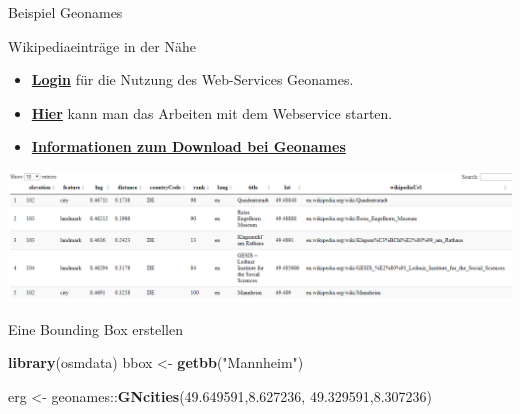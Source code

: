 \documentclass[ignorenonframetext,]{beamer}
\newenvironment{Shaded}{\begin{snugshade}}{\end{snugshade}}
\newcommand{\FloatTok}[1]{\textcolor[rgb]{0.27,0.67,0.26}{#1}}
\newcommand{\KeywordTok}[1]{\textcolor[rgb]{0.26,0.66,0.93}{\textbf{#1}}}
\newcommand{\NormalTok}[1]{\textcolor[rgb]{0.74,0.68,0.62}{#1}}
\newcommand{\OperatorTok}[1]{\textcolor[rgb]{0.74,0.68,0.62}{#1}}
\newcommand{\StringTok}[1]{\textcolor[rgb]{0.02,0.61,0.04}{#1}}
\begin{document}
\begin{frame}{Beispiel Geonames}
\protect\hypertarget{beispiel-geonames}{}

\begin{block}{Wikipediaeinträge in der Nähe}

\begin{itemize}
\item
  \href{http://www.geonames.org/login}{\textbf{Login}} für die Nutzung
  des Web-Services Geonames.
\item
  \href{http://www.geonames.org/enablefreewebservice}{\textbf{Hier}}
  kann man das Arbeiten mit dem Webservice starten.
\item
  \href{http://www.geonames.org/export/ws-overview.html}{\textbf{Informationen
  zum Download bei Geonames}}
\end{itemize}

\includegraphics{figure/Wiki_Mannheim.PNG}

\end{block}

\end{frame}

\begin{frame}[fragile]{Eine Bounding Box erstellen}
\protect\hypertarget{eine-bounding-box-erstellen}{}

\begin{Shaded}
\begin{Highlighting}[]
\KeywordTok{library}\NormalTok{(osmdata)}
\NormalTok{bbox <-}\StringTok{ }\KeywordTok{getbb}\NormalTok{(}\StringTok{"Mannheim"}\NormalTok{)}
\end{Highlighting}
\end{Shaded}

\begin{Shaded}
\begin{Highlighting}[]
\NormalTok{erg <-}\StringTok{ }\NormalTok{geonames}\OperatorTok{::}\KeywordTok{GNcities}\NormalTok{(}\FloatTok{49.649591}\NormalTok{,}\FloatTok{8.627236}\NormalTok{,}
                          \FloatTok{49.329591}\NormalTok{,}\FloatTok{8.307236}\NormalTok{)}
\end{Highlighting}
\end{Shaded}

\end{frame}
\end{document}
